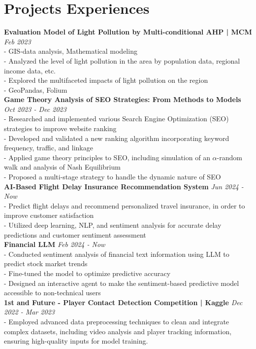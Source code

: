 \documentclass[a4paper,10pt]{article}
\begin{document}
\section*{Projects Experiences}
\textbf{Evaluation Model of Light Pollution by Multi-conditional AHP | MCM} \hfill \textit{Feb 2023}\\
- GIS-data analysis, Mathematical modeling\\
- Analyzed the level of light pollution in the area by population data, regional income data, etc.\\
- Explored the multifaceted impacts of light pollution on the region\\
- GeoPandas, Folium\\
\textbf{Game Theory Analysis of SEO Strategies: From Methods to Models} \hfill \textit{Oct 2023 - Dec 2023}\\
- Researched and implemented various Search Engine Optimization (SEO) strategies to improve website ranking\\
- Developed and validated a new ranking algorithm incorporating keyword frequency, traffic, and linkage\\
- Applied game theory principles to SEO, including simulation of an $\alpha$-random walk and analysis of Nash Equilibrium\\
- Proposed a multi-stage strategy to handle the dynamic nature of SEO\\
\textbf{AI-Based Flight Delay  Insurance Recommendation System} \hfill \textit{Jun 2024 - Now}\\
- Predict flight delays and recommend personalized travel insurance, in order to improve customer satisfaction\\
- Utilized deep learning, NLP, and sentiment analysis for accurate delay predictions and customer sentiment assessment\\
\textbf{Financial LLM} \hfill \textit{Feb 2024 - Now}\\
- Conducted sentiment analysis of financial text information using LLM to predict stock market trends\\
- Fine-tuned the model to optimize predictive accuracy\\
- Designed an interactive agent to make the sentiment-based predictive model accessible to non-technical users\\
\textbf{1st and Future - Player Contact Detection Competition | Kaggle} \hfill \textit{Dec 2022 - Mar 2023}\\
- Employed advanced data preprocessing techniques to clean and integrate complex datasets, including video analysis and player tracking information, ensuring high-quality inputs for model training.\\
\end{document}
